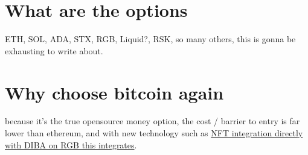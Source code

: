 

\section{What are the options }
ETH, SOL, ADA, STX, RGB, Liquid?, RSK, so many others, this is gonna be exhausting to write about.
\lipsum[50]
\section{Why choose bitcoin again }
because it's the true opensource money option, the cost / barrier to entry is far lower than ethereum, and with new technology such as \href{https://diba.io}{NFT integration directly with DIBA on RGB this integrates}. 
\lipsum[50]